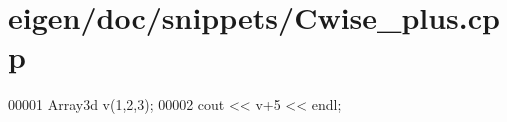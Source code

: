 \hypertarget{eigen_2doc_2snippets_2_cwise__plus_8cpp_source}{}\section{eigen/doc/snippets/\+Cwise\+\_\+plus.cpp}
\label{eigen_2doc_2snippets_2_cwise__plus_8cpp_source}

\begin{DoxyCode}
00001 Array3d v(1,2,3);
00002 cout << v+5 << endl;
\end{DoxyCode}
